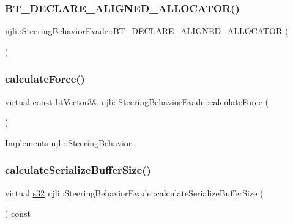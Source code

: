 \subsubsection{\texorpdfstring{B\+T\+\_\+\+D\+E\+C\+L\+A\+R\+E\+\_\+\+A\+L\+I\+G\+N\+E\+D\+\_\+\+A\+L\+L\+O\+C\+A\+T\+O\+R()}{BT\_DECLARE\_ALIGNED\_ALLOCATOR()}}
{\footnotesize\ttfamily njli\+::\+Steering\+Behavior\+Evade\+::\+B\+T\+\_\+\+D\+E\+C\+L\+A\+R\+E\+\_\+\+A\+L\+I\+G\+N\+E\+D\+\_\+\+A\+L\+L\+O\+C\+A\+T\+OR (\begin{DoxyParamCaption}{ }\end{DoxyParamCaption})\hspace{0.3cm}{\ttfamily [protected]}}

\mbox{\label{classnjli_1_1_steering_behavior_evade_aab18adfa89d35b3063f02a1fe9b22ac4}} 
\subsubsection{\texorpdfstring{calculate\+Force()}{calculateForce()}}
{\footnotesize\ttfamily virtual const bt\+Vector3\& njli\+::\+Steering\+Behavior\+Evade\+::calculate\+Force (\begin{DoxyParamCaption}{ }\end{DoxyParamCaption})\hspace{0.3cm}{\ttfamily [virtual]}}



Implements \mbox{\hyperlink{classnjli_1_1_steering_behavior_a9720953de1268f658636213946d76ed3}{njli\+::\+Steering\+Behavior}}.

\mbox{\label{classnjli_1_1_steering_behavior_evade_a15ee5391ccc2506831c1f74888d0b225}} 
\subsubsection{\texorpdfstring{calculate\+Serialize\+Buffer\+Size()}{calculateSerializeBufferSize()}}
{\footnotesize\ttfamily virtual \mbox{\hyperlink{_util_8h_aa62c75d314a0d1f37f79c4b73b2292e2}{s32}} njli\+::\+Steering\+Behavior\+Evade\+::calculate\+Serialize\+Buffer\+Size (\begin{DoxyParamCaption}{ }\end{DoxyParamCaption}) const\hspace{0.3cm}{\ttfamily [virtual]}}

